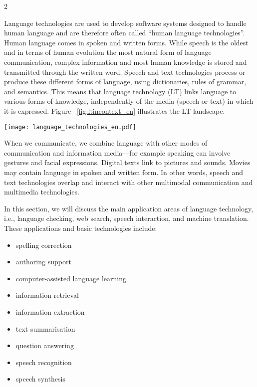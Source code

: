 \begin{multicols}{2}

Language technologies are used to develop software systems designed to handle human language and are therefore often called “human language technologies”. Human language comes in spoken and written forms. While speech is the oldest and in terms of human evolution the most natural form of language communication, complex information and most human knowledge is stored and transmitted through the written word. Speech and text technologies process or produce these different forms of language, using dictionaries, rules of grammar, and semantics. This means that language technology (LT) links language to various forms of knowledge, independently of the media (speech or text) in which it is expressed. Figure ~\ref{fig:ltincontext_en} illustrates the LT landscape.

\begin{figure*}[htb]
  \center
  \texttt{[image: language\_technologies\_en.pdf]}
  \caption{Language technologies}
  \label{fig:ltincontext_en}
\end{figure*}

When we communicate, we combine language with other modes of communication and information media—for example speaking can involve gestures and facial expressions. Digital texts link to pictures and sounds. Movies may contain language in spoken and written form. In other words, speech and text technologies overlap and interact with other multimodal communication and multimedia technologies.

In this section, we will discuss the main application areas of language technology, i.e., language checking, web search, speech interaction, and machine translation. These applications and basic technologies include:

\begin{itemize}
\item spelling correction
\item authoring support
\item computer-assisted language learning
\item information retrieval
\item information extraction
\item text summarisation
\item question answering
\item speech recognition
\item speech synthesis
\end{itemize}


\end{multicols}
